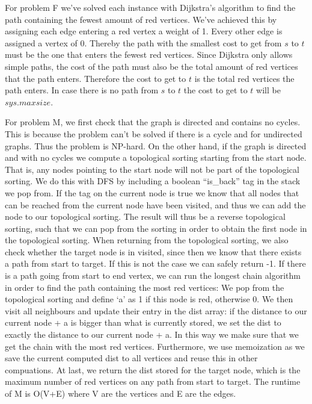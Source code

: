 \documentclass{tufte-handout}
\begin{document}
For problem F we've solved each instance with Dijkstra's algorithm to find the path containing the fewest amount of red vertices. We've achieved this by assigning each edge entering a red vertex a weight of 1. Every other edge is assigned a vertex of 0. Thereby the path with the smallest cost to get from $s$ to $t$ must be the one that enters the fewest red vertices. Since Dijkstra only allows simple paths, the cost of the path must also be the total amount of red vertices that the path enters. Therefore the cost to get to $t$ is the total red vertices the path enters. In case there is no path from $s$ to $t$ the cost to get to $t$ will be $sys.maxsize$.

For problem M, we first check that the graph is directed and contains no cycles. This is because the problem can’t be solved if there is a cycle and for undirected graphs. Thus the problem is NP-hard. On the other hand, if the graph is directed and with no cycles we compute a topological sorting starting from the start node. That is, any nodes pointing to the start node will not
 be part of the topological sorting. We do this with DFS by including a boolean “is\_back” tag in the stack we pop from. If the tag on the current node is true we know that all nodes that can be reached from the current node have been visited, and thus we can add the node to our topological sorting. The result will thus be a reverse topological sorting, 
such that we can pop from the sorting in order to obtain the first node in the topological sorting. When returning from the topological sorting, we also check whether the target node is in visited, since then we know that there exists a path from start to target. If this is not the case we can safely return
 -1. If there is a path going from start to end vertex, we can run the longest chain algorithm in order to find the path containing the most red vertices: We pop from the topological sorting and define ‘a’ as 1 if this node is red, otherwise 0. We then visit all neighbours and update their entry in the dist array: if the distance to our current node + a is bigger
 than what is currently stored, we set the dist to exactly the distance to our current node + a. In this way we make sure that we get the chain with the most red vertices. Furthermore, we use memoization as we save the current computed dist to all vertices and reuse this in other compuations. At last, we return the dist stored for the target node, which is the maximum number of red vertices on any path from start to target. The runtime of M is O(V+E) where V are the vertices and E are the edges.
\end{document}
